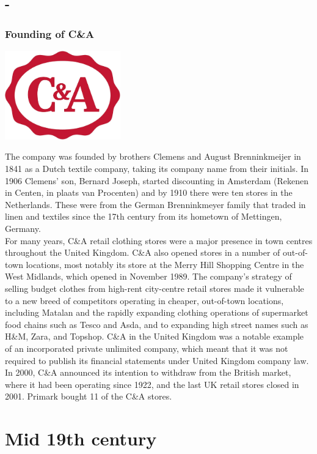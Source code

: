 \documentclass[11pt]{report}
\begin{document}
\section{-}
\subsection{Founding of C\&A}
\vspace{2mm}\begin{center}\includegraphics[width=5cm]{./img/c&aLogo.jpg}\end{center}
The company was founded by brothers Clemens and August Brenninkmeijer in 1841 as a Dutch textile company, taking its company name from their initials. In 1906 Clemens' son, Bernard Joseph, started discounting in Amsterdam (Rekenen in Centen, in plaats van Procenten) and by 1910 there were ten stores in the Netherlands. These were from the German Brenninkmeyer family that traded in linen and textiles since the 17th century from its hometown of Mettingen, Germany.\\
For many years, C\&A retail clothing stores were a major presence in town centres throughout the United Kingdom. C\&A also opened stores in a number of out-of-town locations, most notably its store at the Merry Hill Shopping Centre in the West Midlands, which opened in November 1989. The company's strategy of selling budget clothes from high-rent city-centre retail stores made it vulnerable to a new breed of competitors operating in cheaper, out-of-town locations, including Matalan and the rapidly expanding clothing operations of supermarket food chains such as Tesco and Asda, and to expanding high street names such as H\&M, Zara, and Topshop. C\&A in the United Kingdom was a notable example of an incorporated private unlimited company, which meant that it was not required to publish its financial statements under United Kingdom company law. In 2000, C\&A announced its intention to withdraw from the British market, where it had been operating since 1922, and the last UK retail stores closed in 2001. Primark bought 11 of the C\&A stores.

\chapter{Mid 19th century}
\end{document}
